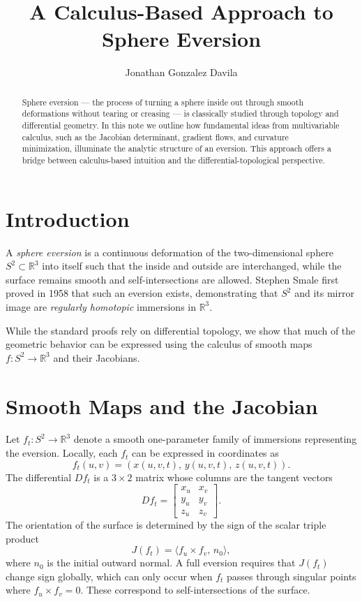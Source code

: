 \documentclass[12pt]{article}
\title{\textbf{A Calculus-Based Approach to Sphere Eversion}}
\author{Jonathan Gonzalez Davila}
\date{} %
\begin{document}
\maketitle

\begin{abstract}
Sphere eversion --- the process of turning a sphere inside out through smooth deformations without tearing or creasing --- is classically studied through topology and differential geometry. In this note we outline how fundamental ideas from multivariable calculus, such as the Jacobian determinant, gradient flows, and curvature minimization, illuminate the analytic structure of an eversion. This approach offers a bridge between calculus-based intuition and the differential-topological perspective.
\end{abstract}

\section{Introduction}
A \emph{sphere eversion} is a continuous deformation of the two-dimensional sphere \( S^2 \subset \mathbb{R}^3 \) into itself such that the inside and outside are interchanged, while the surface remains smooth and self-intersections are allowed. Stephen Smale first proved in 1958 that such an eversion exists, demonstrating that \( S^2 \) and its mirror image are \emph{regularly homotopic} immersions in \( \mathbb{R}^3 \).

While the standard proofs rely on differential topology, we show that much of the geometric behavior can be expressed using the calculus of smooth maps \( f : S^2 \to \mathbb{R}^3 \) and their Jacobians.

\section{Smooth Maps and the Jacobian}
Let \( f_t : S^2 \to \mathbb{R}^3 \) denote a smooth one-parameter family of immersions representing the eversion. Locally, each \( f_t \) can be expressed in coordinates as
\[
f_t(u,v) = (x(u,v,t),\, y(u,v,t),\, z(u,v,t)).
\]
The differential \( Df_t \) is a \( 3 \times 2 \) matrix whose columns are the tangent vectors
\[
Df_t = 
\begin{bmatrix}
x_u & x_v \\
y_u & y_v \\
z_u & z_v
\end{bmatrix}.
\]
The orientation of the surface is determined by the sign of the scalar triple product
\[
J(f_t) = \langle f_u \times f_v,\, n_0 \rangle,
\]
where \( n_0 \) is the initial outward normal. A full eversion requires that \( J(f_t) \) change sign globally, which can only occur when \( f_t \) passes through singular points where \( f_u \times f_v = 0 \). These correspond to self-intersections of the surface.
\end{document}
